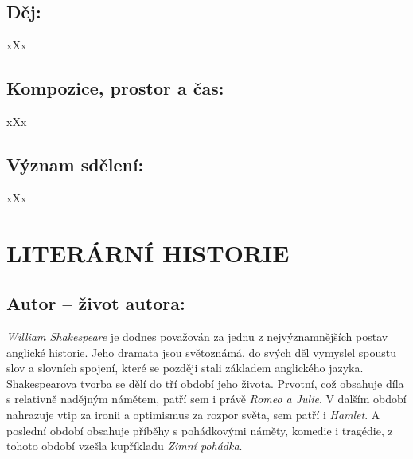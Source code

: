 \documentclass[A4paper]{extarticle} %
\begin{document}
\subsection*{Děj:}
\noindent 
xXx

\subsection*{Kompozice, prostor a čas:}
\noindent 
xXx

\subsection*{Význam sdělení:}
\noindent 
xXx

\section*{LITERÁRNÍ HISTORIE}





\subsection*{Autor {\ssmall -- život autora:}}
\noindent 
\textit{William Shakespeare} je dodnes považován za jednu z nejvýznamnějších postav anglické historie.
Jeho dramata jsou světoznámá, do svých děl vymyslel spoustu slov a slovních spojení, které se později stali základem anglického jazyka. \\
Shakespearova tvorba se dělí do tří období jeho života.
Prvotní, což obsahuje díla s relativně nadějným námětem, patří sem i právě \textit{Romeo a Julie}.
V dalším období nahrazuje vtip za ironii a optimismus za rozpor světa, sem patří i \textit{Hamlet}.
A poslední období obsahuje příběhy s pohádkovými náměty, komedie i tragédie, z tohoto období vzešla kupříkladu \textit{Zimní pohádka}.
\end{document}
